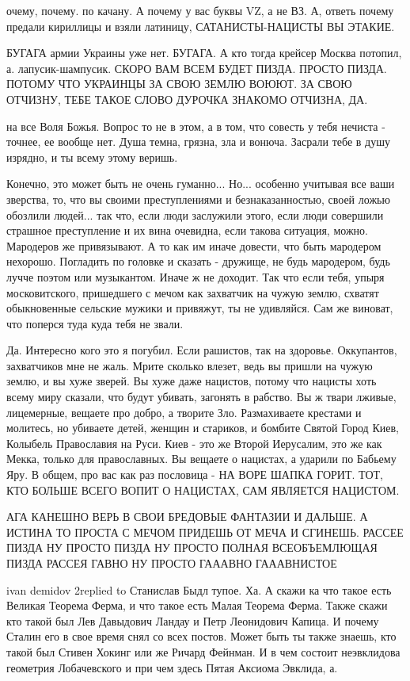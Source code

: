 очему, почему. по качану. А почему у вас буквы VZ, а не ВЗ. А, ответь почему
предали кириллицы и взяли латиницу, САТАНИСТЫ-НАЦИСТЫ ВЫ ЭТАКИЕ.

БУГАГА армии Украины уже нет. БУГАГА. А кто тогда крейсер Москва потопил, а.
лапусик-шампусик. СКОРО ВАМ ВСЕМ БУДЕТ ПИЗДА. ПРОСТО ПИЗДА. ПОТОМУ ЧТО УКРАИНЦЫ ЗА СВОЮ
ЗЕМЛЮ ВОЮЮТ. ЗА СВОЮ ОТЧИЗНУ, ТЕБЕ ТАКОЕ СЛОВО ДУРОЧКА ЗНАКОМО ОТЧИЗНА, ДА.

на все Воля Божья. Вопрос то не в этом, а в том, что совесть у тебя нечиста -
точнее, ее вообще нет. Душа темна, грязна, зла и вонюча. Засрали тебе в душу
изрядно, и ты всему этому веришь.

Конечно, это может быть не очень гуманно... Но... особенно учитывая все ваши зверства, то, что вы своими преступлениями и безнаказанностью, своей ложью обозлили людей... так что, если люди заслужили этого, если люди совершили страшное преступление и их вина очевидна, если такова ситуация, можно. Мародеров же привязывают. А то как им иначе довести, что быть мародером нехорошо. Погладить по головке и сказать - дружище, не будь мародером, будь лучче поэтом или музыкантом. Иначе ж не доходит. Так что если тебя, упыря московитского, пришедшего с мечом как захватчик на чужую землю, схватят обыкновенные сельские мужики и привяжут, ты не удивляйся. Сам же виноват, что поперся туда куда тебя не звали.

Да. Интересно кого это я погубил. Если рашистов, так на здоровье. Оккупантов,
захватчиков мне не жаль. Мрите сколько влезет, ведь вы пришли на чужую землю, и
вы хуже зверей. Вы хуже даже нацистов, потому что нацисты хоть всему миру
сказали, что будут убивать, загонять в рабство. Вы ж твари лживые, лицемерные,
вещаете про добро, а творите Зло. Размахиваете крестами и молитесь, но убиваете
детей, женщин и стариков, и бомбите Святой Город Киев, Колыбель Православия на
Руси. Киев - это же Второй Иерусалим, это же как Мекка, только для
православных. Вы вещаете о нацистах, а ударили по Бабьему Яру. В общем, про вас
как раз пословица - НА ВОРЕ ШАПКА ГОРИТ. ТОТ, КТО БОЛЬШЕ ВСЕГО ВОПИТ О
НАЦИСТАХ, САМ ЯВЛЯЕТСЯ НАЦИСТОМ.

АГА КАНЕШНО ВЕРЬ В СВОИ БРЕДОВЫЕ ФАНТАЗИИ И ДАЛЬШЕ. А ИСТИНА ТО ПРОСТА С МЕЧОМ
ПРИДЕШЬ ОТ МЕЧА И СГИНЕШЬ. РАССЕЕ ПИЗДА НУ ПРОСТО ПИЗДА НУ ПРОСТО ПОЛНАЯ
ВСЕОБЪЕМЛЮЩАЯ ПИЗДА РАССЕЯ ГАВНО НУ ПРОСТО ГАААВНО ГАААВНИСТОЕ

ivan demidov 2replied to Станислав
Быдл тупое. Ха. А скажи ка что такое есть Великая Теорема Ферма, и что такое
есть Малая Теорема Ферма. Также скажи кто такой был Лев Давыдович Ландау и Петр
Леонидович Капица. И почему Сталин его в свое время снял со всех постов. Может
быть ты также знаешь, кто такой был Стивен Хокинг или же Ричард Фейнман. И в
чем состоит неэвклидова геометрия Лобачевского и при чем здесь Пятая Аксиома
Эвклида, а.

